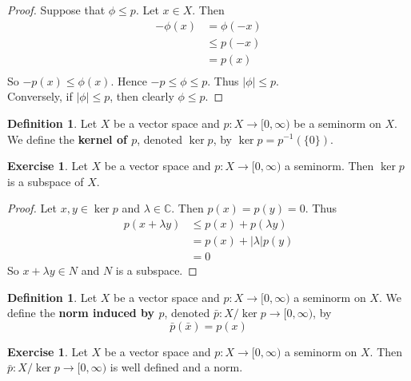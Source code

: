 \documentclass[12pt]{amsart}
\theoremstyle{definition}
\newtheorem{defn}[definition]{Definition}
\newtheorem{ex}[definition]{Exercise}
\newcommand{\lam}{\lambda}
\newcommand{\C}{\mathbb{C}}
\newcommand{\Rg}{[0,\infty)}
\begin{document}
	\begin{proof}
		Suppose that $\phi \leq p$. Let $x \in X$. Then 
		\begin{align*}
			-\phi(x)
			& = \phi(-x) \\
			& \leq p(-x) \\
			& = p(x) \\
		\end{align*}
		So $-p(x) \leq \phi(x)$. Hence $-p \leq \phi \leq p$. Thus $|\phi| \leq p$. \\
		Conversely, if $|\phi| \leq p$, then clearly $\phi \leq p$.
	\end{proof}
	
	\begin{defn}
		Let $X$ be a vector space and $p:X \rightarrow \Rg$ be a seminorm on $X$. We define the \textbf{kernel of $p$}, denoted $\ker p$, by $\ker p = p^{-1}(\{0\})$.
	\end{defn}
	
	\begin{ex}
		Let $X$ be a vector space and $p: X \rightarrow \Rg$ a seminorm. Then $\ker p$ is a subspace of $X$.
	\end{ex}
	
	\begin{proof}
		Let $x, y \in \ker p$ and $\lam \in \C$. Then $p(x) = p(y) = 0$. Thus 
		\begin{align*}
			p(x + \lam y) 
			&\leq p(x) + p(\lam y) \\
			&= p(x) + |\lam|p(y) \\
			&= 0
		\end{align*} 
		So $x + \lam y \in N$ and $N$ is a subspace.
	\end{proof}
	
	
	\begin{defn}
		Let $X$ be a vector space and $p:X \rightarrow [0, \infty)$ a seminorm on $X$. We define the \textbf{norm induced by $p$}, denoted $\bar{p} : X / \ker p \rightarrow  \Rg$, by $$\bar{p}(\bar{x}) = p(x)$$
	\end{defn}
	
	\begin{ex}
		Let $X$ be a vector space and $p:X \rightarrow [0, \infty)$ a seminorm on $X$. Then $\bar{p} : X / \ker p \rightarrow  \Rg$ is well defined and a norm. 
	\end{ex}
	
\end{document}
